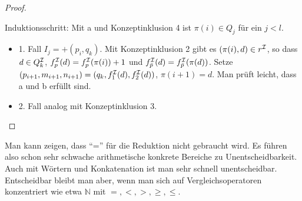 \begin{tafel}
\begin{proof}
\begin{itemize}
            Induktionsschritt: Mit a und Konzeptinklusion 4 ist $\pi(i) \in Q_j$ für ein $j < l$.
            \begin{itemize}
                \item 1. Fall $I_j = +(p_i, q_k)$. Mit Konzeptinklusion 2 gibt es $(\pi(i), d) \in r^{\mathcal{I}}$, so dass $d \in Q^{\mathcal{I}}_k$, $f^{\mathcal{I}}_p(d) = f^{\mathcal{I}}_p(\pi(i)) + 1$ und $f^{\mathcal{I}}_{\bar{p}}(d) = f^{\mathcal{I}}_{\bar{p}}(\pi(d))$. Setze $(p_{i + 1}, m_{i + 1}, n_{i + 1}) = (q_k, f^{\mathcal{I}}_1(d), f^{\mathcal{I}}_2(d))$, $\pi(i + 1) = d$.
                    Man prüft leicht, dass a und b erfüllt sind.
                \item 2. Fall analog mit Konzeptinklusion 3.
            \end{itemize}
    \end{itemize}
\end{proof}
\end{tafel}


Man kann zeigen, dass \enquote{=} für die Reduktion nicht gebraucht wird. Es
führen also schon sehr schwache arithmetische konkrete Bereiche zu
Unentscheidbarkeit. Auch mit Wörtern und Konkatenation ist man sehr schnell
unentscheidbar. Entscheidbar bleibt man aber, wenn man sich auf
Vergleichsoperatoren konzentriert wie etwa $\mathbb{N}$ mit $=, <, >, \geq,
\leq$.


